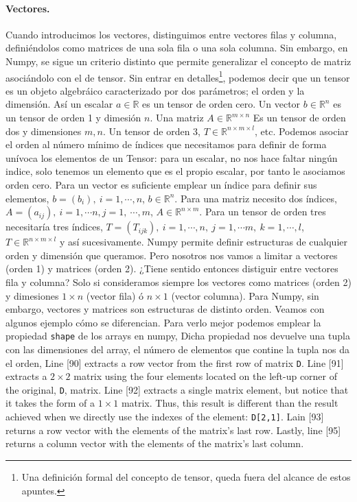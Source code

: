 \begin{paracol}{2}
\paragraph{Vectores.}
Cuando introducimos los vectores, distinguimos entre vectores filas y columna, definiéndolos como matrices de una sola fila o una sola columna. Sin embargo, en Numpy, se sigue un criterio distinto que permite generalizar el concepto de matriz asociándolo con el de tensor. Sin entrar en detalles\footnote{Una definición formal del concepto de tensor, queda fuera del alcance de estos apuntes.}, podemos decir que un tensor es un objeto algebráico caracterizado por dos parámetros; el orden y la dimensión. Así un escalar $a \in \mathbb{R}$ es un tensor de orden cero. Un vector $b \in \mathbb{R}^n$ es un tensor de orden 1 y dimesión $n$. Una matriz $A \in \mathbb{R}^{m\times n}$ Es un tensor de orden dos y dimensiones $m,n$. Un tensor de orden 3, $T \in \mathbb{R}^{n\times m \times l}$, etc. Podemos asociar el orden al número mínimo de índices que necesitamos para definir de forma unívoca los elementos de un Tensor: para un escalar, no nos hace faltar ningún indice, solo tenemos un elemento que es el propio escalar, por tanto le asociamos orden cero. Para un vector es suficiente emplear un índice para definir sus elementos, $b=(b_i),\ i=1,\cdots, n$, $b \in \mathbb{R}^n$. Para una matriz necesito dos índices, $A=(a_{ij}),\ i =1, \cdots n, j = 1,\ \cdots, m$, $A \in \mathbb{R}^{n\times m}$. Para un tensor de orden tres necesitaría tres índices, $T=(T_{ijk}),\ i =1,\cdots, n,\ j =1,\cdots m,\ k = 1,\cdots, l$, $T\in \mathbb{R}^{n\times m \times l}$ y así sucesivamente. Numpy permite definir estructuras de cualquier orden y dimensión que queramos. Pero nosotros nos vamos a limitar a vectores (orden 1) y matrices (orden 2). ¿Tiene sentido entonces distiguir entre vectores fila y columna? Solo si consideramos siempre los vectores como matrices (orden 2) y dimesiones $1\times n$ (vector fila) ó $n \times 1$ (vector columna). Para Numpy, sin embargo, vectores y matrices son estructuras de distinto orden. Veamos con algunos ejemplo cómo se diferencian. Para verlo mejor podemos emplear la propiedad \texttt{shape} de los arrays en numpy, Dicha propiedad nos devuelve una tupla con las dimensiones del array, el número de elementos que contine la tupla nos da el orden,
\switchcolumn
Line [90] extracts a row vector from the first row of matrix \texttt{D}. Line [91] extracts a $2\times 2$ matrix using the four elements located on the left-up corner of the original, \texttt{D}, matrix. Line [92] extracts a single matrix element, but notice that it takes the form of a $1\times 1$ matrix. Thus, this result is different than the result achieved when we directly use the indexes of the element: \texttt{D[2,1]}. Lain [93] returns a row vector with the elements of the matrix's last row. Lastly, line [95] returns a column vector with the elements of the matrix's last column.


\end{paracol}
